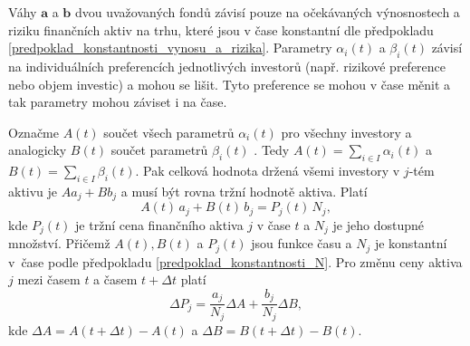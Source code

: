 \documentclass[a4paper,12pt]{report}
\theoremstyle{definition} \newtheorem{definice}[veta]{Definice}
\theoremstyle{remark}
\begin{document}
Váhy $\boldsymbol{a}$ a  $\boldsymbol{b}$ dvou uvažovaných fondů závisí pouze na očekávaných výnosnostech a riziku finančních aktiv na trhu, které jsou v čase konstantní dle předpokladu \ref{predpoklad_konstantnosti_vynosu_a_rizika}.
Parametry $\alpha_i(t)$ a $\beta_i(t)$ závisí na individuálních preferencích jednotlivých investorů (např. rizikové preference nebo objem investic) a mohou se lišit.
Tyto preference se mohou v čase měnit a tak parametry mohou záviset i na čase.

Označme $A(t)$ součet všech parametrů $\alpha_i(t)$ pro všechny investory a analogicky $B(t)$ součet parametrů $\beta_i(t)$ .
Tedy $A(t)=\sum_{i\in I}\alpha_i(t)$ a $B(t)=\sum_{i\in I}\beta_i(t)$.
Pak celková hodnota držená všemi investory v $j$-tém aktivu je $Aa_j+Bb_j$ a musí být rovna tržní hodnotě aktiva.
Platí
$$A(t)\,a_j+B(t)\,b_j=P_j(t)\,N_j,$$
kde $P_j(t)$ je tržní cena finančního aktiva $j$ v čase $t$ a $N_j$ je jeho dostupné množství.
Přičemž $A(t),B(t)$ a $ P_j(t)$ jsou funkce času a $N_j$ je konstantní v~čase podle předpokladu \ref{predpoklad_konstantnosti_N}.
Pro změnu ceny aktiva $j$ mezi časem $t$ a časem $t+\Delta t$ platí
\begin{displaymath}
\Delta P_j = \frac{a_j}{N_j}\Delta A + \frac{b_j}{N_j}\Delta B,
\end{displaymath}
kde $\Delta A = A(t+\Delta t) - A(t)$ a $\Delta B = B(t+\Delta t)- B(t)$.
\end{document}

